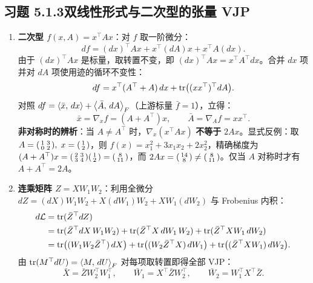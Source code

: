 \subsection*{习题 5.1.3\quad 双线性形式与二次型的张量 VJP}
\begin{enumerate}[label=(\arabic*), leftmargin=1.8em]
  \item \textbf{二次型 $f(x, A) = x^\top A x$}：对 $f$ 取一阶微分：
  \[
    df = (dx)^\top A x + x^\top (dA) x + x^\top A (dx).
  \]
  由于 $(dx)^\top A x$ 是标量，取转置不变，即 $(dx)^\top A x = x^\top A^\top dx$。合并 $dx$ 项并对 $dA$ 项使用迹的循环不变性：
  \[
    df = x^\top (A^\top + A)\, dx + \operatorname{tr}\!\big((x x^\top)^\top dA\big).
  \]
  对照 $df = \left\langle \bar{x},\, dx \right\rangle + \left\langle \bar{A},\, dA \right\rangle_F$（上游标量 $\bar{f} = 1$），立得：
  \[
    \bar{x} = \nabla_x f = (A + A^\top) x, \qquad
    \bar{A} = \nabla_A f = x x^\top.
  \]
  \textbf{非对称时的辨析}：当 $A \neq A^\top$ 时，$\nabla_x (x^\top A x)$ \textbf{不等于} $2 A x$。显式反例：取 $A = \begin{psmallmatrix} 1 & 3 \\ 0 & 2 \end{psmallmatrix},\; x = \begin{psmallmatrix} 1 \\ 2 \end{psmallmatrix}$，则 $f(x) = x_1^2 + 3 x_1 x_2 + 2 x_2^2$，精确梯度为 $(A + A^\top)x = \begin{psmallmatrix} 2 & 3 \\ 3 & 4 \end{psmallmatrix}\begin{psmallmatrix} 1 \\ 2 \end{psmallmatrix} = \begin{psmallmatrix} 8 \\ 11 \end{psmallmatrix}$，而 $2 A x = \begin{psmallmatrix} 14 \\ 8 \end{psmallmatrix} \neq \begin{psmallmatrix} 8 \\ 11 \end{psmallmatrix}$。仅当 $A$ 对称时才有 $A + A^\top = 2A$。

  \item \textbf{连乘矩阵 $Z = X W_1 W_2$}：利用全微分 $dZ = (dX) W_1 W_2 + X (dW_1) W_2 + X W_1 (dW_2)$ 与 Frobenius 内积：
  \begin{align*}
    d\mathcal{L} &= \operatorname{tr}(\bar{Z}^\top dZ) \\
    &= \operatorname{tr}(\bar{Z}^\top dX\, W_1 W_2) + \operatorname{tr}(\bar{Z}^\top X\, dW_1\, W_2) + \operatorname{tr}(\bar{Z}^\top X W_1\, dW_2) \\
    &= \operatorname{tr}\!\big((W_1 W_2 \bar{Z}^\top)\, dX\big)
     + \operatorname{tr}\!\big((W_2 \bar{Z}^\top X)\, dW_1\big)
     + \operatorname{tr}\!\big((\bar{Z}^\top X W_1)\, dW_2\big).
  \end{align*}
  由 $\operatorname{tr}(M^\top dU) = \left\langle M,\, dU \right\rangle_F$ 对每项取转置即得全部 VJP：
  \[
    \bar{X} = \bar{Z} W_2^\top W_1^\top, \qquad
    \bar{W}_1 = X^\top \bar{Z} W_2^\top, \qquad
    \bar{W}_2 = W_1^\top X^\top \bar{Z}.
  \]
\end{enumerate}

